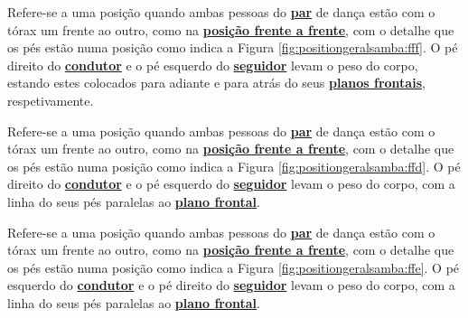 \begin{definition}
\label{def:fff-position}  
Refere-se a uma posição quando ambas pessoas do \hyperref[def:Par]{\textbf{par}} 
de dança estão com o tórax um frente ao outro, 
como na \hyperref[def:frente-frente-position]{\textbf{posição frente a frente}},
com o detalhe que os pés estão numa posição como indica a Figura \ref{fig:positiongeralsamba:fff}.
O pé direito do \hyperref[def:Condutor]{\textbf{condutor}} e 
o pé esquerdo do \hyperref[def:Seguidor]{\textbf{seguidor}} levam o peso do corpo,
estando estes colocados para adiante e para atrás do seus \hyperref[def:PlanoFrontal]{\textbf{planos frontais}}, 
respetivamente.
\end{definition}

\begin{definition}
\label{def:ffd-position}  
Refere-se a uma posição quando ambas pessoas do \hyperref[def:Par]{\textbf{par}} 
de dança estão com o tórax um frente ao outro, 
como na \hyperref[def:frente-frente-position]{\textbf{posição frente a frente}},
com o detalhe que os pés estão numa posição como indica a Figura \ref{fig:positiongeralsamba:ffd}.
O pé direito do \hyperref[def:Condutor]{\textbf{condutor}} e 
o pé esquerdo do \hyperref[def:Seguidor]{\textbf{seguidor}} levam o peso do corpo,
com a linha do seus pés paralelas ao \hyperref[def:PlanoFrontal]{\textbf{plano frontal}}.
\end{definition}


\begin{definition}
\label{def:ffe-position}  
Refere-se a uma posição quando ambas pessoas do \hyperref[def:Par]{\textbf{par}} 
de dança estão com o tórax um frente ao outro, 
como na \hyperref[def:frente-frente-position]{\textbf{posição frente a frente}},
com o detalhe que os pés estão numa posição como indica a Figura \ref{fig:positiongeralsamba:ffe}.
O pé esquerdo do \hyperref[def:Condutor]{\textbf{condutor}} e 
o pé direito do \hyperref[def:Seguidor]{\textbf{seguidor}} levam o peso do corpo,
com a linha do seus pés paralelas ao \hyperref[def:PlanoFrontal]{\textbf{plano frontal}}.
\end{definition}


